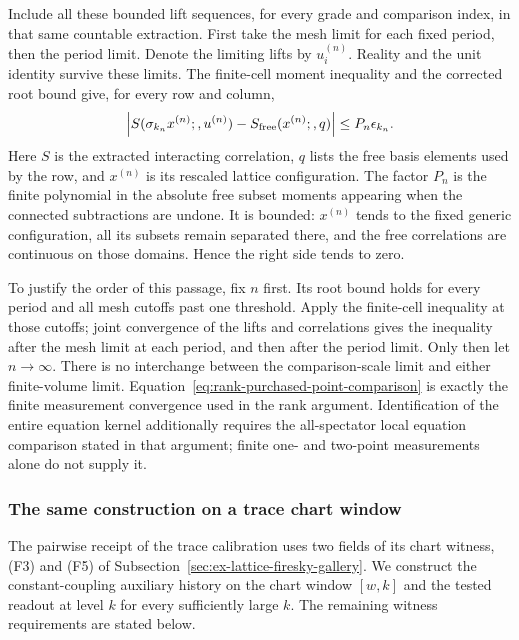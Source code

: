 Include all these bounded lift sequences, for every grade and comparison
index, in that same countable extraction. First take the mesh limit for
each fixed period, then the period limit. Denote the limiting lifts by
$u_i^{(n)}$. Reality and the unit identity survive these limits. The
finite-cell moment inequality and the corrected root bound give, for
every row and column,
\begin{equation}\label{eq:rank-purchased-point-comparison}
 \left|S(\sigma_{k_n}x^{(n)};,u^{(n)})
                 -S_{\rm free}(x^{(n)};,q)\right|
             \le P_n\epsilon_{k_n}.
\end{equation}
Here $S$ is the extracted interacting correlation, $q$ lists the free
basis elements used by the row, and $x^{(n)}$ is its rescaled lattice
configuration. The factor $P_n$ is the finite polynomial in the absolute
free subset moments appearing when the connected subtractions are
undone. It is bounded: $x^{(n)}$ tends to the fixed generic configuration,
all its subsets remain separated there, and the free correlations are
continuous on those domains. Hence the right side tends to zero.

To justify the order of this passage, fix $n$ first. Its root bound holds
for every period and all mesh cutoffs past one threshold. Apply the
finite-cell inequality at those cutoffs; joint convergence of the lifts
and correlations gives the inequality after the mesh limit at each
period, and then after the period limit. Only then let $n\to\infty$.
There is no interchange between the comparison-scale limit and either
finite-volume limit. Equation~\eqref{eq:rank-purchased-point-comparison}
is exactly the finite measurement convergence used in the rank argument.
Identification of the entire equation kernel additionally requires the
all-spectator local equation comparison stated in that argument; finite
one- and two-point measurements alone do not supply it.

\subsubsection{The same construction on a trace chart window}
\label{subsec:rank-trace-chart-window}

The pairwise receipt of the trace calibration uses two fields of its
chart witness, (F3) and (F5) of Subsection~\ref{sec:ex-lattice-firesky-gallery}.
We construct the constant-coupling auxiliary history on the chart window
$[w,k]$ and the tested readout at level $k$ for every sufficiently large
$k$. The remaining witness requirements are stated below.

